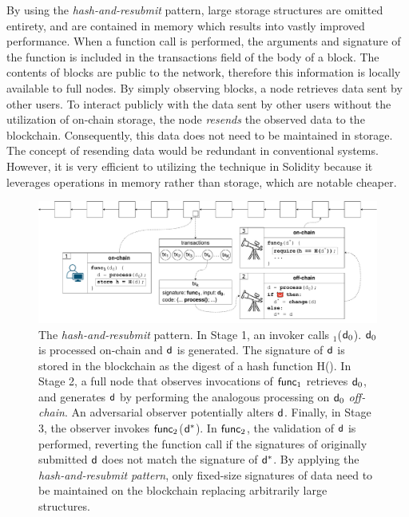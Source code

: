 By using the \emph{hash-and-resubmit} pattern, large storage structures are
omitted entirety, and are contained in memory which results into vastly
improved performance. When a function call is performed, the arguments and
signature of the function is included in the transactions field of the body of
a block. The contents of blocks are public to the network, therefore this
information is locally available to full nodes. By simply observing blocks, a
node retrieves data sent by other users. To interact publicly with the data
sent by other users without the utilization of on-chain storage, the node
\emph{resends} the observed data to the blockchain. Consequently, this data
does not need to be maintained in storage. The concept of resending data would
be redundant in conventional systems. However, it is very efficient to
utilizing the technique in Solidity because it leverages operations in memory
rather than storage, which are notable cheaper.
\begin{figure}[h]
    \begin{center} \includegraphics[width=1\textwidth]{figures/har-pattern.pdf}
    \end{center}

    \caption{The \emph{hash-and-resubmit} pattern. In Stage 1, an invoker calls
        \proc$_1$($\mathsf{d}_0$). $\mathsf{d}_0$ is processed on-chain and $\mathsf{d}$ is
        generated. The signature of $\mathsf{d}$ is stored in the blockchain as the
        digest of a hash function \textsf{H}(). In Stage 2, a full node that
        observes invocations of $\textsf{func}_1$ retrieves $\mathsf{d}_0$, and generates
        $\mathsf{d}$ by performing the analogous processing on $\mathsf{d}_0$
        \emph{off-chain}. An adversarial observer potentially alters $\mathsf{d}$.
        Finally, in Stage 3, the observer invokes $\textsf{func}_2$($\mathsf{d}^*$). In
        $\textsf{func}_2$, the validation of $\mathsf{d}$ is performed, reverting the
        function call if the signatures of originally submitted $\mathsf{d}$ does
        not match the signature of $\mathsf{d}^*$. By applying the
        \emph{hash-and-resubmit pattern}, only fixed-size signatures of data
        need to be maintained on the blockchain replacing arbitrarily large
        structures.}

        \label{fig:har-pattern}
\end{figure}

